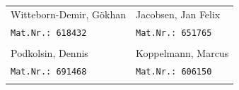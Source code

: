 	\vspace{-1cm}
	\begin{tabular}{ll}
		\large{Witteborn-Demir, Gökhan}  &  \large{Jacobsen, Jan Felix}\\
		\texttt{Mat.Nr.: 618432}    	 &  \texttt{Mat.Nr.: 651765}\\
		& \\
		\large{Podkolsin, Dennis}   	 &  \large{Koppelmann, Marcus}\\
		\texttt{Mat.Nr.: 691468}    	 &  \texttt{Mat.Nr.: 606150}\\
		& \\
	\end{tabular}

	
	\pagebreak
	
